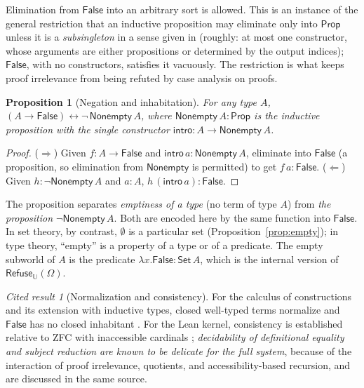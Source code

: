 \documentclass[11pt]{article}
\newcommand{\Refuse}{\mathsf{Refuse}}
\newcommand{\U}{\mathbb{U}}
\newcommand{\Om}{\Omega}
\newcommand{\Prop}{\mathsf{Prop}}
\theoremstyle{definition}
\theoremstyle{plain}
\newtheorem{proposition}[definition]{Proposition}
\theoremstyle{remark}
\newtheorem{cited}[definition]{Cited result}
\begin{document}
Elimination from $\mathsf{False}$ into an arbitrary sort is allowed. This is an instance of the general restriction that an inductive proposition may eliminate only into $\Prop$ unless it is a \emph{subsingleton} in a sense given in \cite{Carneiro19} (roughly: at most one constructor, whose arguments are either propositions or determined by the output indices); $\mathsf{False}$, with no constructors, satisfies it vacuously. The restriction is what keeps proof irrelevance from being refuted by case analysis on proofs.

\begin{proposition}[Negation and inhabitation]\label{prop:negnon}
For any type $A$, $(A\to\mathsf{False})\leftrightarrow\neg\,\mathsf{Nonempty}\,A$, where $\mathsf{Nonempty}\,A:\Prop$ is the inductive proposition with the single constructor $\mathsf{intro}:A\to\mathsf{Nonempty}\,A$.
\end{proposition}
\begin{proof}
($\Rightarrow$) Given $f:A\to\mathsf{False}$ and $\mathsf{intro}\,a:\mathsf{Nonempty}\,A$, eliminate into $\mathsf{False}$ (a proposition, so elimination from $\mathsf{Nonempty}$ is permitted) to get $f\,a:\mathsf{False}$. ($\Leftarrow$) Given $h:\neg\mathsf{Nonempty}\,A$ and $a:A$, $h\,(\mathsf{intro}\,a):\mathsf{False}$.
\end{proof}

The proposition separates \emph{emptiness of a type} (no term of type $A$) from \emph{the proposition $\neg\mathsf{Nonempty}\,A$}. Both are encoded here by the same function into $\mathsf{False}$. In set theory, by contrast, $\emptyset$ is a particular set (Proposition~\ref{prop:empty}); in type theory, ``empty'' is a property of a type or of a predicate. The empty subworld of $A$ is the predicate $\lambda x.\mathsf{False}:\mathsf{Set}\,A$, which is the internal version of $\Refuse_{\U}(\Om)$.

\begin{cited}[Normalization and consistency]\label{cit:norm}
For the calculus of constructions and its extension with inductive types, closed well-typed terms normalize and $\mathsf{False}$ has no closed inhabitant \cite{CoquandHuet88,CoquandPaulin90,Werner94}. For the Lean kernel, consistency is established relative to ZFC with inaccessible cardinals \cite{Carneiro19}; \emph{decidability of definitional equality and subject reduction are known to be delicate for the full system}, because of the interaction of proof irrelevance, quotients, and accessibility-based recursion, and are discussed in the same source.
\end{cited}
\end{document}
